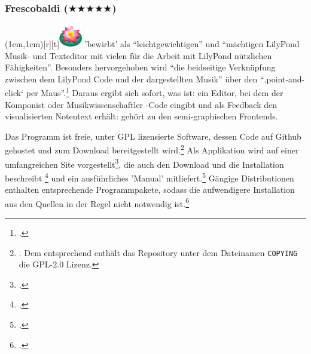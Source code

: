 %
%
%



\subsubsection{Frescobaldi ($\bigstar\bigstar\bigstar\bigstar\bigstar$)}

\parpic(1cm,1cm)[r][t]{\includegraphics[width=1cm]{logos/frescobaldi-300dpi.png}}
\label{Frescobaldi} 'bewirbt'  als
\enquote{leichtgewichtigen} und \enquote{mächtigen LilyPond Musik- und
Texteditor mit vielen für die Arbeit mit LilyPond nützlichen Fähigkeiten}.
Besonders hervorgehoben wird \enquote{die beidseitige Verknüpfung zwischen dem
LilyPond Code und der dargestellten Musik} über den \enquote{‚point-and-click‘
per Maus}.\footcite[vgl.][\nopage wp]{LilyPond2018g} Daraus ergibt sich sofort,
was  ist: ein Editor, bei dem der Komponist oder
Musikwissenschaftler -Code eingibt und als Feedback den
visualisierten Notentext erhält:  gehört zu den
semi-graphischen Frontends.

Das Programm ist freie, unter GPL lizensierte Software, dessen Code auf Github
ge\-hos\-tet und zum Download bereitgestellt wird.\footnote{\cite[vgl.][\nopage
wp]{Frescobaldi2019a}. Dem entsprechend enthält das Repository unter dem
Dateinamen \texttt{COPYING} die GPL-2.0 Lizenz.} Als Applikation wird
 auf einer umfangreichen Site vorgestellt\footcite[vgl.][\nopage
wp]{Frescobaldi2017a}, die auch den Download und die Installation beschreibt
\footcite[vgl.][\nopage wp]{Frescobaldi2015a} und ein ausführliches 'Manual'
mitliefert.\footcite[vgl.][\nopage wp]{Frescobaldi2012a} Gängige Distributionen
enthalten entsprechende Programmpakete, sodass die aufwendigere Installation aus
den Quellen in der Regel nicht notwendig ist.\footcite[vgl.][\nopage
wp]{UbuntuFrescobaldi2016a}


